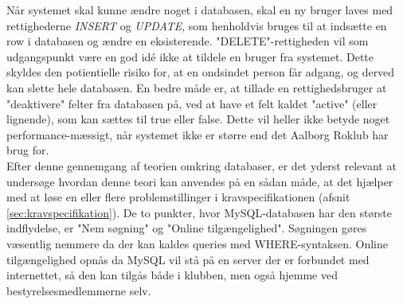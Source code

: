 Når systemet skal kunne ændre noget i databasen, skal en ny bruger laves med rettighederne \textit{INSERT} og \textit{UPDATE}, som henholdvis bruges til at indsætte en row i databasen og ændre en eksisterende. "DELETE"\mbox{}-rettigheden vil som udgangspunkt være en god idé ikke at tildele en bruger fra systemet. Dette skyldes den potientielle risiko for, at en ondsindet person får adgang, og derved kan slette hele databasen. En bedre måde er, at tillade en rettighedsbruger at "deaktivere" felter fra databasen på, ved at have et felt kaldet "active" (eller lignende), som kan sættes til true eller false. Dette vil heller ikke betyde noget performance-mæssigt, når systemet ikke er større end det Aalborg Roklub har brug for.\\

Efter denne gennemgang af teorien omkring databaser, er det yderst relevant at undersøge hvordan denne teori kan anvendes på en sådan måde, at det hjælper med at løse en eller flere problemstillinger i kravspecifikationen (afsnit \ref{sec:kravspecifikation}). De to punkter, hvor MySQL-databasen har den største indflydelse, er "Nem søgning" og "Online tilgængelighed". Søgningen gøres væsentlig nemmere da der kan kaldes queries med WHERE-syntaksen. Online tilgængelighed opnås da MySQL vil stå på en server der er forbundet med internettet, så den kan tilgås både i klubben, men også hjemme ved bestyrelsesmedlemmerne selv.